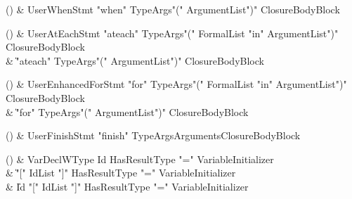 \begin{bbgrammarappendix}{3.8in}

() & UserWhenStmt \label{prod:UserWhenStmt}  \:
 \xcd"when" TypeArgs\opt \xcd"(" ArgumentList\opt \xcd")" ClosureBodyBlock

\end{bbgrammarappendix}

\begin{bbgrammarappendix}{4.0in}

() & UserAtEachStmt \label{prod:UserAtEachStmt}  \:
 \xcd"ateach" TypeArgs\opt \xcd"(" FormalList \xcd"in" ArgumentList\opt \xcd")" ClosureBodyBlock \\
 &    \| \xcd"ateach" TypeArgs\opt \xcd"(" ArgumentList\opt \xcd")" ClosureBodyBlock

\end{bbgrammarappendix}

\begin{bbgrammarappendix}{4.0in}

() & UserEnhancedForStmt \label{prod:UserEnhancedForStmt}  \:
 \xcd"for" TypeArgs\opt \xcd"(" FormalList \xcd"in" ArgumentList\opt \xcd")" ClosureBodyBlock \\
 &    \| \xcd"for" TypeArgs\opt \xcd"(" ArgumentList\opt \xcd")" ClosureBodyBlock

\end{bbgrammarappendix}

\begin{bbgrammarappendix}{3.8in}

() & UserFinishStmt \label{prod:UserFinishStmt}  \:
 \xcd"finish" TypeArgs\opt Arguments\opt ClosureBodyBlock

\end{bbgrammarappendix}


\begin{bbgrammarappendix}{3.8in}

() & VarDeclWType \label{prod:VarDeclWType}  \: Id HasResultType \xcd"=" VariableInitializer  \\

 &    \| \xcd"[" IdList \xcd"]" HasResultType \xcd"=" VariableInitializer \\
 &    \| Id \xcd"[" IdList \xcd"]" HasResultType \xcd"=" VariableInitializer \\

\end{bbgrammarappendix}

